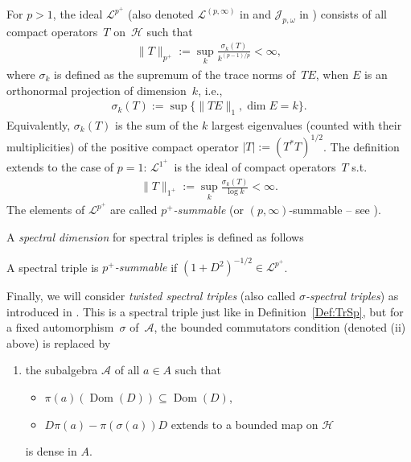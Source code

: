 \documentclass[11pt]{article}
\newcommand{\Aa}{\mathcal{A}}
\newcommand{\Hh}{\mathscr{H}}
\newcommand{\Jj}{\mathcal{J}}
\newcommand{\SymmIdeal}{\mathscr{L}}
\DeclareMathOperator{\dom}{Dom}
\numberwithin{equation}{section}
\begin{document}
\begin{Definition}
\label{Def:DixmierSum}
For $p>1$, the ideal $\SymmIdeal^{p^+}$ (also denoted $\SymmIdeal^{(p,\infty )}$ in \cite{NCG} and $\Jj_{p, \omega}$ in \cite[p.~21]{TraceIdealsSimon}) consists of all compact operators~$T$ on~$\Hh$ such that
\begin{gather*}
\| T\|_{p^+} := \sup_k \frac{ \sigma_k(T)}{k^{(p-1)/p}} < \infty,
\end{gather*}
where $\sigma_k$ is def\/ined as the supremum of the trace norms of~$T E$, when $E$ is an orthonormal projection of dimension~$k$, i.e.,
\begin{gather*}
 \sigma_k(T) := \sup \{ \| T E \|_1 , \dim E = k \}.
\end{gather*}
Equivalently, $\sigma_k(T)$ is the sum of the $k$ largest eigenvalues (counted with their multiplicities) of the positive compact operator $|T| := (T^* T)^{1/2}$. The def\/inition extends to the case of $p = 1$: $\SymmIdeal^{1^+}$~is the ideal of compact operators~$T$ s.t.\
\begin{gather*}
\| T \|_{1^+} := \sup_k \frac{ \sigma_k(T)}{\log k} < \infty .
\end{gather*}
The elements of $\SymmIdeal^{p^+}$ are called \emph{$p^+$-summable} (or $(p, \infty )$-summable -- see \cite[Section~IV.2$\alpha$, p.~299 and following]{NCG}).
\end{Definition}

A \emph{spectral dimension} for spectral triples is def\/ined as follows
\begin{Definition}
A spectral triple is \emph{$p^+$-summable} if $(1 + D^2)^{-1/2} \in \SymmIdeal^{p^+}$.
\end{Definition}

Finally, we will consider \emph{twisted spectral triples} (also called \emph{$\sigma$-spectral triples}) as introduced in \cite[Def\/inition~3.1]{TrSpTypeIII}. This is a spectral triple just like in Def\/inition~\ref{Def:TrSp}, but for a f\/ixed automorphism~$\sigma$ of~$\Aa$, the bounded commutators condition (denoted (ii) %
above) is replaced by
\begin{enumerate}\itemsep=0pt
\item[(ii)]
the subalgebra $\Aa$ of all $a\in A$ such that
\begin{itemize}\itemsep=0pt
\item
$\pi(a) (\dom(D)) \subseteq \dom(D)$,
\item
$D\pi(a) - \pi(\sigma(a)) D$ extends to a bounded map on $\Hh$
\end{itemize}
is dense in $A$.
\end{enumerate}
\end{document}
